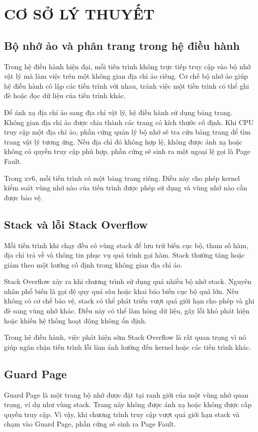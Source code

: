 \chapter{CƠ SỞ LÝ THUYẾT}

\section{Bộ nhớ ảo và phân trang trong hệ điều hành}
Trong hệ điều hành hiện đại, mỗi tiến trình không trực tiếp truy cập vào bộ nhớ vật lý mà làm việc trên một không gian địa chỉ ảo riêng. Cơ chế bộ nhớ ảo giúp hệ điều hành cô lập các tiến trình với nhau, tránh việc một tiến trình có thể ghi đè hoặc đọc dữ liệu của tiến trình khác.

Để ánh xạ địa chỉ ảo sang địa chỉ vật lý, hệ điều hành sử dụng bảng trang. Không gian địa chỉ ảo được chia thành các trang có kích thước cố định. Khi CPU truy cập một địa chỉ ảo, phần cứng quản lý bộ nhớ sẽ tra cứu bảng trang để tìm trang vật lý tương ứng. Nếu địa chỉ đó không hợp lệ, không được ánh xạ hoặc không có quyền truy cập phù hợp, phần cứng sẽ sinh ra một ngoại lệ gọi là Page Fault.

Trong xv6, mỗi tiến trình có một bảng trang riêng. Điều này cho phép kernel kiểm soát vùng nhớ nào của tiến trình được phép sử dụng và vùng nhớ nào cần được bảo vệ.

\section{Stack và lỗi Stack Overflow}
Mỗi tiến trình khi chạy đều có vùng stack để lưu trữ biến cục bộ, tham số hàm, địa chỉ trả về và thông tin phục vụ quá trình gọi hàm. Stack thường tăng hoặc giảm theo một hướng cố định trong không gian địa chỉ ảo.

Stack Overflow xảy ra khi chương trình sử dụng quá nhiều bộ nhớ stack. Nguyên nhân phổ biến là gọi đệ quy quá sâu hoặc khai báo biến cục bộ quá lớn. Nếu không có cơ chế bảo vệ, stack có thể phát triển vượt quá giới hạn cho phép và ghi đè sang vùng nhớ khác. Điều này có thể làm hỏng dữ liệu, gây lỗi khó phát hiện hoặc khiến hệ thống hoạt động không ổn định.

Trong hệ điều hành, việc phát hiện sớm Stack Overflow là rất quan trọng vì nó giúp ngăn chặn tiến trình lỗi làm ảnh hưởng đến kernel hoặc các tiến trình khác.



\section{Guard Page}
Guard Page là một trang bộ nhớ được đặt tại ranh giới của một vùng nhớ quan trọng, ví dụ như vùng stack. Trang này không được ánh xạ hoặc không được cấp quyền truy cập. Vì vậy, khi chương trình truy cập vượt quá giới hạn stack và chạm vào Guard Page, phần cứng sẽ sinh ra Page Fault.

